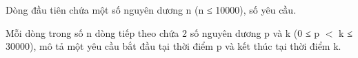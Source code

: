 Dòng đầu tiên chứa một số nguyên dương n (n ≤ 10000), số yêu cầu.  

   Mỗi dòng trong số n dòng tiếp theo chứa 2 số nguyên dương p và k (0 ≤ p $<$ k ≤ 30000), mô tả một yêu cầu bắt đầu tại thời điểm p và kết thúc tại thời điểm k.  

\